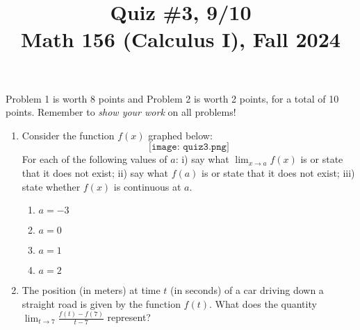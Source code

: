 \documentclass[11pt]{article}
\title{Quiz \#3, 9/10 \\ Math 156 (Calculus I), Fall 2024}
\date{}
\begin{document}
\maketitle

\thispagestyle{empty}

\vspace{-2cm}

Problem 1 is worth 8 points and Problem 2 is worth 2 points, for a total of 10 points. Remember to \emph{show your work} on all problems!

\begin{enumerate}
\item Consider the function $f(x)$ graphed below:
\[ \texttt{[image: quiz3.png]}\]
For each of the following values of $a$: i) say what $\displaystyle \lim_{x \to a} f(x)$ is or state that it does not exist; ii) say what $f(a)$ is or state that it does not exist; iii) state whether $f(x)$ is continuous at $a$.
\begin{multicols}{2}
\begin{enumerate}
\item $a=-3$
\item $a=0$
\item $a=1$
\item $a=2$
\end{enumerate}
\end{multicols}

\vspace{5cm}

\item The position (in meters) at time $t$ (in seconds) of a car driving down a straight road is given by the function $f(t)$. What does the quantity $\displaystyle \lim_{t \to 7} \frac{f(t) - f(7)}{t-7}$ represent?

\end{enumerate}
\end{document}
